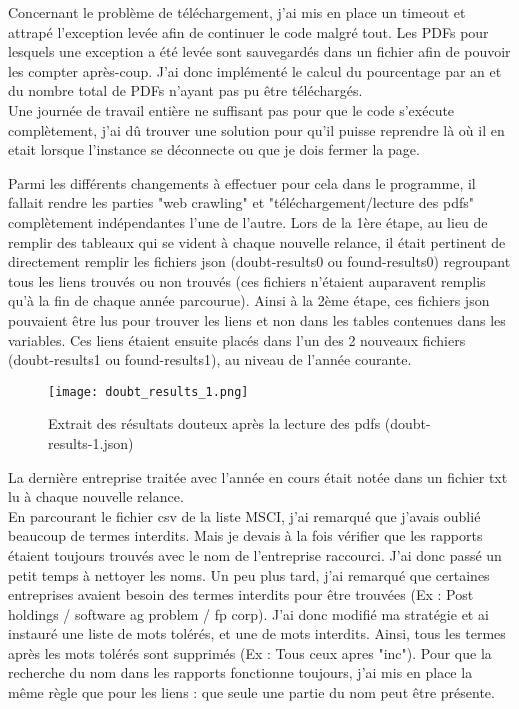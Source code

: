 Concernant le problème de téléchargement, j'ai mis en place un timeout et attrapé l'exception levée afin de continuer le code malgré tout. 
Les PDFs pour lesquels une exception a été levée sont sauvegardés dans un fichier afin de pouvoir les compter après-coup.
J'ai donc implémenté le calcul du pourcentage par an et du nombre total de PDFs n'ayant pas pu être téléchargés.
\\

Une journée de travail entière ne suffisant pas pour que le code s'exécute complètement, j'ai dû trouver une solution pour qu'il puisse reprendre là où il en etait lorsque l'instance se déconnecte ou que je dois fermer la page.

Parmi les différents changements à effectuer pour cela dans le programme, il fallait rendre les parties "web crawling" et "téléchargement/lecture des pdfs" complètement indépendantes l'une de l'autre.
Lors de la 1ère étape, au lieu de remplir des tableaux qui se vident à chaque nouvelle relance, il était pertinent de directement remplir les fichiers json (doubt-results0 ou found-results0) regroupant tous les liens trouvés ou non trouvés (ces fichiers n'étaient auparavent remplis qu'à la fin de chaque année parcourue). 
Ainsi à la 2ème étape, ces fichiers json pouvaient être lus pour trouver les liens et non dans les tables contenues dans les variables.
Ces liens étaient ensuite placés dans l'un des 2 nouveaux fichiers (doubt-results1 ou found-results1), au niveau de l'année courante.

\begin{figure}[H]
    \centering
    \texttt{[image: doubt\_results\_1.png]}
    \caption{Extrait des résultats douteux après la lecture des pdfs (doubt-results-1.json)}
\end{figure}

La dernière entreprise traitée avec l'année en cours était notée dans un fichier txt lu à chaque nouvelle relance.
\\

En parcourant le fichier csv de la liste MSCI, j'ai remarqué que j'avais oublié beaucoup de termes interdits. 
Mais je devais à la fois vérifier que les rapports étaient toujours trouvés avec le nom de l'entreprise raccourci.
J'ai donc passé un petit temps à nettoyer les noms.
Un peu plus tard, j'ai remarqué que certaines entreprises avaient besoin des termes interdits pour être trouvées (Ex : Post holdings / software ag problem / fp corp).
J'ai donc modifié ma stratégie et ai instauré une liste de mots tolérés, et une de mots interdits. Ainsi, tous les termes après les mots tolérés sont supprimés (Ex : Tous ceux apres "inc").
Pour que la recherche du nom dans les rapports fonctionne toujours, j'ai mis en place la même règle que pour les liens : que seule une partie du nom peut être présente.
\\

